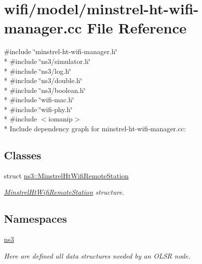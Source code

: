 \hypertarget{minstrel-ht-wifi-manager_8cc}{}\section{wifi/model/minstrel-\/ht-\/wifi-\/manager.cc File Reference}
\label{minstrel-ht-wifi-manager_8cc}
{\ttfamily \#include \char`\"{}minstrel-\/ht-\/wifi-\/manager.\+h\char`\"{}}\\*
{\ttfamily \#include \char`\"{}ns3/simulator.\+h\char`\"{}}\\*
{\ttfamily \#include \char`\"{}ns3/log.\+h\char`\"{}}\\*
{\ttfamily \#include \char`\"{}ns3/double.\+h\char`\"{}}\\*
{\ttfamily \#include \char`\"{}ns3/boolean.\+h\char`\"{}}\\*
{\ttfamily \#include \char`\"{}wifi-\/mac.\+h\char`\"{}}\\*
{\ttfamily \#include \char`\"{}wifi-\/phy.\+h\char`\"{}}\\*
{\ttfamily \#include $<$iomanip$>$}\\*
Include dependency graph for minstrel-\/ht-\/wifi-\/manager.cc\+:
\subsection*{Classes}
\begin{DoxyCompactItemize}
\item 
struct \hyperlink{structns3_1_1MinstrelHtWifiRemoteStation}{ns3\+::\+Minstrel\+Ht\+Wifi\+Remote\+Station}
\begin{DoxyCompactList}\small\item\em \hyperlink{structns3_1_1MinstrelHtWifiRemoteStation}{Minstrel\+Ht\+Wifi\+Remote\+Station} structure. \end{DoxyCompactList}\end{DoxyCompactItemize}
\subsection*{Namespaces}
\begin{DoxyCompactItemize}
\item 
 \hyperlink{namespacens3}{ns3}
\begin{DoxyCompactList}\small\item\em Here are defined all data structures needed by an O\+L\+SR node. \end{DoxyCompactList}\end{DoxyCompactItemize}
